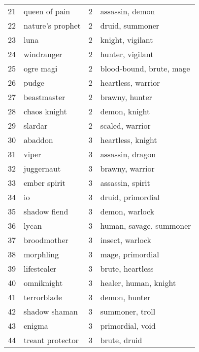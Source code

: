 \documentclass{article}
\begin{document}
\begin{table}
{\begin{tabular}{llrl}
21 &        queen of pain &      2 &                assassin, demon \\
22 &     nature's prophet &      2 &                druid, summoner \\
23 &                 luna &      2 &               knight, vigilant \\
24 &           windranger &      2 &               hunter, vigilant \\
25 &            ogre magi &      2 &       blood-bound, brute, mage \\
26 &                pudge &      2 &            heartless, warrior  \\
27 &          beastmaster &      2 &                 brawny, hunter \\
28 &         chaos knight &      2 &                  demon, knight \\
29 &              slardar &      2 &               scaled, warrior  \\
30 &              abaddon &      3 &              heartless, knight \\
31 &                viper &      3 &               assassin, dragon \\
32 &           juggernaut &      3 &               brawny, warrior  \\
33 &         ember spirit &      3 &               assassin, spirit \\
34 &                   io &      3 &              druid, primordial \\
35 &         shadow fiend &      3 &                demon, warlock  \\
36 &                lycan &      3 &        human, savage, summoner \\
37 &          broodmother &      3 &               insect, warlock  \\
38 &            morphling &      3 &               mage, primordial \\
39 &          lifestealer &      3 &               brute, heartless \\
40 &           omniknight &      3 &          healer, human, knight \\
41 &          terrorblade &      3 &                  demon, hunter \\
42 &        shadow shaman &      3 &                summoner, troll \\
43 &               enigma &      3 &               primordial, void \\
44 &     treant protector &      3 &                   brute, druid \\

\end{tabular}}
\end{table}
\end{document}
